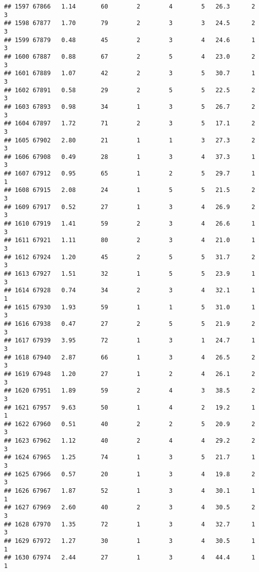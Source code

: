 \documentclass[
]{article}
\begin{document}
\begin{verbatim}
## 1597 67866   1.14       60        2        4        5   26.3      2      3
## 1598 67877   1.70       79        2        3        3   24.5      2      3
## 1599 67879   0.48       45        2        3        4   24.6      1      3
## 1600 67887   0.88       67        2        5        4   23.0      2      3
## 1601 67889   1.07       42        2        3        5   30.7      1      3
## 1602 67891   0.58       29        2        5        5   22.5      2      3
## 1603 67893   0.98       34        1        3        5   26.7      2      3
## 1604 67897   1.72       71        2        3        5   17.1      2      3
## 1605 67902   2.80       21        1        1        3   27.3      2      3
## 1606 67908   0.49       28        1        3        4   37.3      1      3
## 1607 67912   0.95       65        1        2        5   29.7      1      1
## 1608 67915   2.08       24        1        5        5   21.5      2      3
## 1609 67917   0.52       27        1        3        4   26.9      2      3
## 1610 67919   1.41       59        2        3        4   26.6      1      3
## 1611 67921   1.11       80        2        3        4   21.0      1      3
## 1612 67924   1.20       45        2        5        5   31.7      2      3
## 1613 67927   1.51       32        1        5        5   23.9      1      3
## 1614 67928   0.74       34        2        3        4   32.1      1      1
## 1615 67930   1.93       59        1        1        5   31.0      1      3
## 1616 67938   0.47       27        2        5        5   21.9      2      3
## 1617 67939   3.95       72        1        3        1   24.7      1      3
## 1618 67940   2.87       66        1        3        4   26.5      2      3
## 1619 67948   1.20       27        1        2        4   26.1      2      3
## 1620 67951   1.89       59        2        4        3   38.5      2      3
## 1621 67957   9.63       50        1        4        2   19.2      1      1
## 1622 67960   0.51       40        2        2        5   20.9      2      3
## 1623 67962   1.12       40        2        4        4   29.2      2      3
## 1624 67965   1.25       74        1        3        5   21.7      1      3
## 1625 67966   0.57       20        1        3        4   19.8      2      3
## 1626 67967   1.87       52        1        3        4   30.1      1      1
## 1627 67969   2.60       40        2        3        4   30.5      2      3
## 1628 67970   1.35       72        1        3        4   32.7      1      3
## 1629 67972   1.27       30        1        3        4   30.5      1      1
## 1630 67974   2.44       27        1        3        4   44.4      1      1

\end{verbatim}
\end{document}
